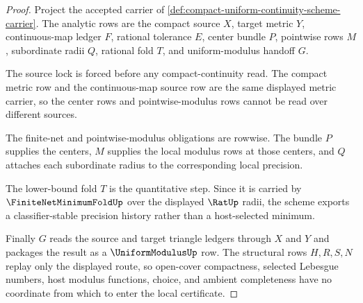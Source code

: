 \begin{proof}
Project the accepted carrier of \autoref{def:compact-uniform-continuity-scheme-carrier}. The analytic rows are the compact source $X$, target metric $Y$, continuous-map ledger $F$, rational tolerance $E$, center bundle $P$, pointwise rows $M$, subordinate radii $Q$, rational fold $T$, and uniform-modulus handoff $G$.

The source lock is forced before any compact-continuity read. The compact metric row and the continuous-map source row are the same displayed metric carrier, so the center rows and pointwise-modulus rows cannot be read over different sources.

The finite-net and pointwise-modulus obligations are rowwise. The bundle $P$ supplies the centers, $M$ supplies the local modulus rows at those centers, and $Q$ attaches each subordinate radius to the corresponding local precision.

The lower-bound fold $T$ is the quantitative step. Since it is carried by $\FiniteNetMinimumFoldUp$ over the displayed $\RatUp$ radii, the scheme exports a classifier-stable precision history rather than a host-selected minimum.

Finally $G$ reads the source and target triangle ledgers through $X$ and $Y$ and packages the result as a $\UniformModulusUp$ row. The structural rows $H,R,S,N$ replay only the displayed route, so open-cover compactness, selected Lebesgue numbers, host modulus functions, choice, and ambient completeness have no coordinate from which to enter the local certificate.
\end{proof}

